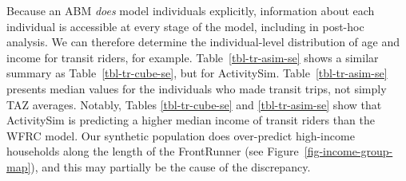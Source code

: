 \documentclass[fancy, oneside, mastersfancy, ms]{byuthesis}
\begin{document}
Because an ABM \emph{does} model individuals explicitly, information
about each individual is accessible at every stage of the model,
including in post-hoc analysis. We can therefore determine the
individual-level distribution of age and income for transit riders, for
example. Table~\ref{tbl-tr-asim-se} shows a similar summary as
Table~\ref{tbl-tr-cube-se}, but for ActivitySim.
Table~\ref{tbl-tr-asim-se} presents median values for the individuals
who made transit trips, not simply TAZ averages. Notably, Tables
\ref{tbl-tr-cube-se} and \ref{tbl-tr-asim-se} show that ActivitySim is
predicting a higher median income of transit riders than the WFRC model.
Our synthetic population does over-predict high-income households along
the length of the FrontRunner (see Figure~\ref{fig-income-group-map}),
and this may partially be the cause of the discrepancy.

\begin{table}

\caption{\label{tbl-tr-asim-se}Example Socioeconomic Analysis of Transit
Trips (ActivitySim)}


\end{table}%
\end{document}
